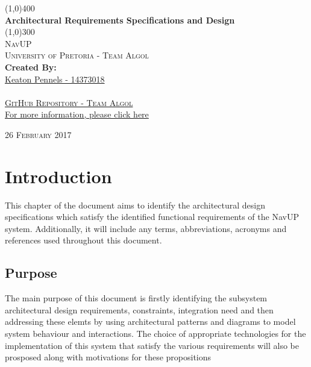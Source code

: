 \documentclass{article}
\begin{document}
	\begin{titlepage}
		\begin{center}

			\line(1,0){400}\\
			[6mm]
			\huge{
				\bfseries Architectural Requirements Specifications and Design
			}\\
			[2mm]
			\line(1,0){300}\\
			[15mm]
			\textsc{\large NavUP}\\
			[7.5mm]
			\textsc{\large University of Pretoria - Team Algol}\\
			[20mm]
			\large{\textbf{Created By:}}\\
			[2mm]
			\large{
				\href{https://github.com/KeatonPennels}{Keaton Pennels - 14373018}\\
			}\\
			[5cm]

		\href{https://github.com/Chris19951225/COS-301-Team-Algol}{\textsc{\Large GitHub Repository - Team Algol}\\[2mm]
		  For more information, please click here}
		\end{center}
		\begin{flushright}
			\textsc{\large 26 February 2017}
		\end{flushright}
	\end{titlepage}

	\cleardoublepage
	\thispagestyle{empty}
	\tableofcontents
	\cleardoublepage

	\thispagestyle{empty}
	\listoffigures
	\cleardoublepage
	\setcounter{page}{1}
	
	
	\section{Introduction}\label{sec:intro}
		This chapter of the document aims to identify the architectural design specifications which satisfy the identified functional requirements of the NavUP system. Additionally, it will include any terms, abbreviations, acronyms and references used throughout this document.
	
		\subsection{Purpose}\label{subsec:purpose}
			The main purpose of this document is firstly identifying the subsystem architectural design requirements, constraints, integration need  and then addressing these elemts by using architectural patterns and diagrams to model system behaviour and interactions. The choice of appropriate technologies for the implementation of this system that satisfy the various requirements will also be prosposed along with motivations for these propositions 
				
\end{document}
